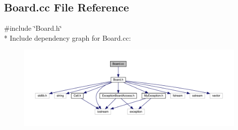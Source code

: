 \hypertarget{a00092}{}\subsection{Board.\+cc File Reference}
\label{a00092}
{\ttfamily \#include \char`\"{}Board.\+h\char`\"{}}\\*
Include dependency graph for Board.\+cc\+:\nopagebreak
\begin{figure}[H]
\begin{center}
\leavevmode
\includegraphics[width=350pt]{a00126}
\end{center}
\end{figure}
